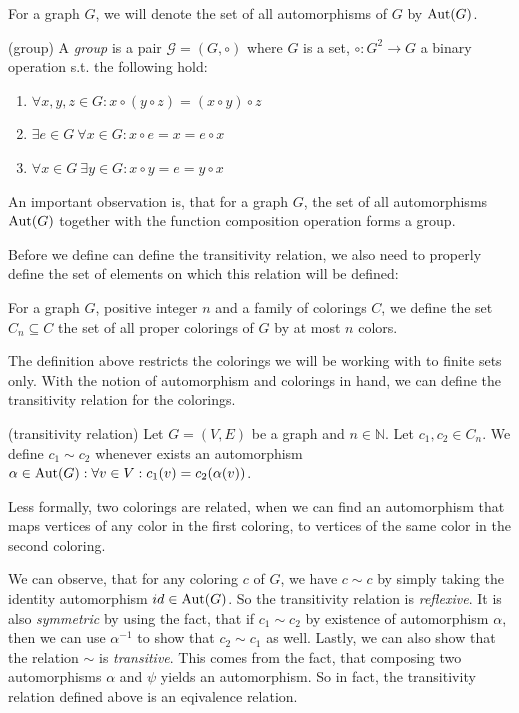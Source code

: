 For a graph $G$, we will denote the set of all automorphisms of $G$ by $\operatorname{Aut}(G)$.

\begin{defn}(group)
    A \emph{group} is a pair $\mathcal{G}=(G,\circ)$ where $G$ is a set, $\circ:G^2 \rightarrow G$ a binary operation s.t. the following hold:
    \begin{enumerate}
        \item $\forall x,y,z \in G : x \circ (y \circ z) = ( x \circ y ) \circ z$
        \item $\exists e \in G \ \forall x \in G :x \circ e = x = e \circ x$
        \item $ \forall x \in G \ \exists y \in G : x \circ y = e = y \circ x$
    \end{enumerate}
\end{defn}

An important observation is, that for a graph $G$, the set of all automorphisms $\operatorname{Aut}(G)$ together with the function composition operation forms a group. 

Before we define can define the transitivity relation, we also need to properly define the set of elements on which this relation will be defined:

\begin{defn}
    For a graph $G$, positive integer $n$ and a family of colorings $C$, we define the set $C_n \subseteq C$ the set of all proper colorings of $G$ by at most $n$ colors.
\end{defn}

The definition above restricts the colorings we will be working with to finite sets only. With the notion of automorphism and colorings in hand, we can define the transitivity relation for the colorings.

\begin{defn}(transitivity relation)
        Let $G=(V,E)$ be a graph and $n\in \mathbb{N}$. Let $c_1,c_2 \in C_n$. We define $c_1 \sim c_2$ whenever exists an automorphism $\alpha \in \operatorname{Aut}(G) : \forall v \in V : c_1(v)=c_2(\alpha(v))$.
\end{defn}

Less formally, two colorings are related, when we can find an automorphism that maps vertices of any color in the first coloring, to vertices of the same color in the second coloring. 

We can observe, that for any coloring $c$ of $G$, we have $c \sim c$ by simply taking the identity automorphism $id \in \operatorname{Aut}(G)$. So the transitivity relation is \textit{reflexive}. It is also \textit{symmetric} by using the fact, that if $c_1 \sim c_2$ by existence of automorphism $\alpha$, then we can use $\alpha^{-1}$ to show that $c_2 \sim c_1$ as well. Lastly, we can also show that the relation $\sim$ is \textit{transitive}. This comes from the fact, that composing two automorphisms $\alpha$ and $\psi$ yields an automorphism. So in fact, the transitivity relation defined above is an eqivalence relation.

